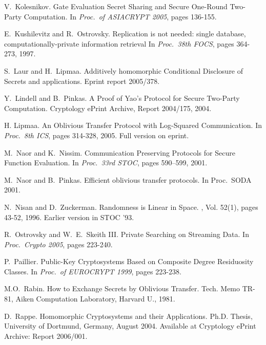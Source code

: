 \documentclass[11pt]{article}
\begin{document}
\begin{footnotesize}
\begin{thebibliography}{10}
		V.~Kolesnikov.
		\newblock  Gate Evaluation Secret Sharing and Secure
		One-Round Two-Party Computation.
		\newblock In {\em Proc.\ of ASIACRYPT 2005}, pages 136-155.
		
		E.~Kushilevitz and R.~Ostrovsky.
		\newblock Replication is not needed: single database, computationally-private
		information retrieval
		\newblock In {\em Proc.\ 38th FOCS}, pages 364-273, 1997.
		
		S.~Laur and H.~Lipmaa.
		\newblock Additively homomorphic Conditional Disclosure of Secrets and applications.
		\newblock Eprint report 2005/378.
		
		Y.~Lindell and B.~Pinkas.
		\newblock A Proof of Yao's Protocol for Secure Two-Party Computation.
		\newblock Cryptology ePrint Archive, Report 2004/175, 2004.
		
		
		H. Lipmaa.
		\newblock An Oblivious Transfer Protocol with Log-Squared Communication.
		\newblock In {\em Proc.\ 8th ICS}, pages 314-328, 2005. Full
		version on eprint.
		
		 M.~Naor and K.~Nissim.
		\newblock Communication Preserving Protocols for Secure Function
		Evaluation.
		\newblock In {\em Proc.\ 33rd STOC}, pages 590--599, 2001.
		
		 M.~Naor and B.~Pinkas.
		\newblock Efficient oblivious transfer protocols.
		\newblock In {Proc.\ SODA 2001}.
		
		 N.~Nisan and D.~Zuckerman.
		\newblock Randomness is Linear in Space.
		, Vol. 52(1), pages 43-52, 1996.
		\newblock Earlier version in STOC '93.
		
		R.~Ostrovsky and W.~E.~Skeith III.
		\newblock  Private Searching on
		Streaming Data.
		\newblock In {\em Proc.\ Crypto 2005}, pages 223-240.
		
		P.~Paillier.
		\newblock  Public-Key Cryptosystems Based on Composite Degree Residuosity
		Classes.
		\newblock  In {\em Proc.\ of EUROCRYPT 1999}, pages 223-238.
		
		M.O.~Rabin.
		\newblock How to Exchange Secrets by Oblivious Transfer.
		\newblock Tech. Memo TR-81, Aiken Computation Laboratory, Harvard U., 1981.
		
		D.~Rappe.
		\newblock Homomorphic Cryptosystems and their Applications.
		\newblock Ph.D. Thesis, University of Dortmund, Germany, August 2004.
		Available at Cryptology ePrint Archive: Report 2006/001.
		

\end{thebibliography}
\end{footnotesize}
\end{document}
